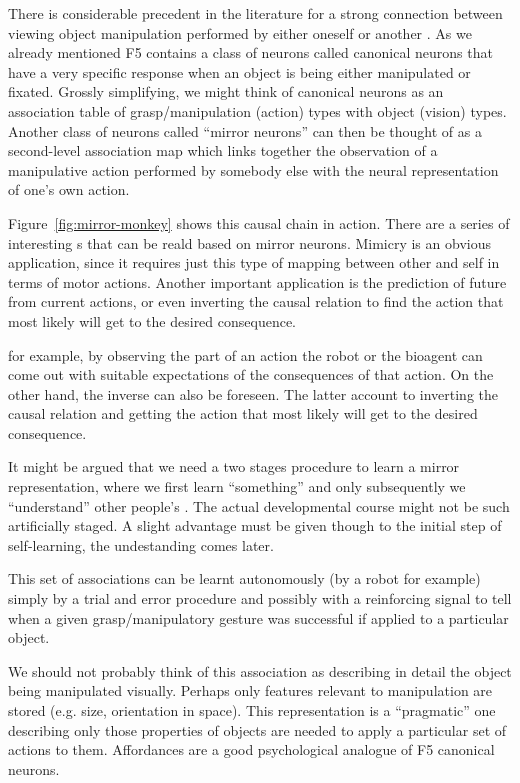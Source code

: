 \ifverbose
There is considerable precedent in the literature for a strong
connection between viewing object manipulation performed by either
oneself or another \cite{wohlsclager02human}.  As we already mentioned
F5 contains a class of neurons called canonical neurons that have a
very specific response when an object is being either manipulated or
fixated.  Grossly simplifying, we might think of canonical neurons as
an association table of grasp/manipulation (action) types with object
(vision) types.  Another class of neurons called ``mirror neurons''
can then be thought of as a second-level association map which links
together the observation of a manipulative action performed by
somebody else with the neural representation of one's own action.
\fi

Figure~\ref{fig:mirror-monkey} shows this causal chain in action.
There are a series of interesting \ahhbehavior{}s that can be real\ize{}d based
on mirror neurons. Mimicry is an obvious application, since it
requires just this type of mapping between other and self in terms of
motor actions.  Another important application is the prediction of
future \ahhbehavior{} from current actions, or even inverting the causal
relation to find the action that most likely will get to the desired
consequence.

\ifverbose

for example, by observing the part of an action the robot or the
bioagent can come out with suitable expectations of the consequences
of that action. On the other hand, the inverse \ahhbehavior{} can also be
foreseen. The latter account to inverting the causal relation and
getting the action that most likely will get to the desired
consequence.

It might be argued that we need a two stages procedure to learn a
mirror representation, where we first learn ``something'' and only
subsequently we ``understand'' other people's \ahhbehavior{}. The actual
developmental course might not be such artificially staged. A slight
advantage must be given though to the initial step of self-learning,
the undestanding comes later.


This set of associations can be learnt autonomously (by a robot for
example) simply by a trial and error procedure and possibly with a
reinforcing signal to tell when a given grasp/manipulatory gesture was
successful if applied to a particular object.

We should not probably think of this association as describing in
detail the object being manipulated visually. Perhaps only features
relevant to manipulation are stored (e.g. size, orientation in space).
This representation is a ``pragmatic'' one describing only those
properties of objects are needed to apply a particular set of actions
to them. Affordances are a good psychological analogue of F5
canonical neurons.
\fi


